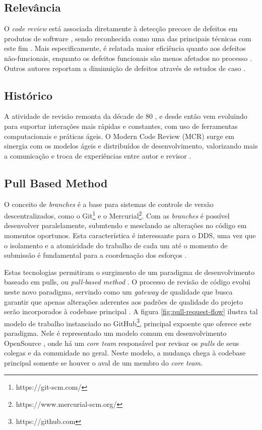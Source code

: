 \documentclass[12pt,openany,oneside,a4paper,english,brazil]{abntbibufjf}
\begin{document}
  \subsection{Relevância}\label{sec:relevancia}
    O \textit{code review} está associada diretamente à detecção precoce de defeitos em produtos de software \cite{schettino2014,Kemerer2009}, sendo reconhecida como uma das principais técnicas com este fim \cite{Boehm2001}. Mais especificamente, é relatada maior eficiência quanto aos defeitos não-funcionais, enquanto os defeitos funcionais são menos afetados no processo \cite{Beller2014202}. Outros autores reportam a diminuição de defeitos através de estudos de caso \cite{McIntosh2014192,Bavota201581,Morales2015171}.

  \subsection{Histórico}\label{sec:historico}
    A atividade de revisão remonta da décade de 80 \cite{Fagan1976}, e desde então vem evoluindo para suportar interações mais rápidas e constantes, com uso de ferramentas computacionais e práticas ágeis. O Modern Code Review (MCR) surge em sinergia com os modelos ágeis e distribuídos de desenvolvimento, valorizando mais a comunicação e troca de experiências entre autor e revisor \cite{Bacchelli2013}.

  \subsection{Pull Based Method}\label{sec:pull_based}
    O conceito de \textit{branches} é a base para sistemas de controle de versão descentralizados, como o  Git\footnote{https://git-scm.com/} e o Mercurial\footnote{https://www.mercurial-scm.org/}. Com as \textit{branches} é possível desenvolver paralelamente, submtendo e mesclando as alterações no código em momentos oportunos. Esta característica é interessante para o DDS, uma vez que o isolamento e a atomicidade do trabalho de cada um até o momento de submissão é fundamental para a coordenação dos esforços \cite{barr2012}.

    Estas tecnologias permitiram o surgimento de um paradigma de desenvolvimento baseado em pulls, ou \textit{pull-based method} \cite{gousios2014}. O processo de revisão de código evolui neste novo paradigma, servindo como um \textit{gateway} de qualidade que busca garantir que apenas alterações aderentes aos padrões de qualidade do projeto serão incorporados à codebase principal \cite{gousios2015}. A figura \ref{fig:pull-request-flow} ilustra tal modelo de trabalho instanciado no GitHub\footnote{https://github.com}, principal expoente que oferece este paradigma. Nele é representado um modelo comum em desenvolvimento OpenSource \cite{6385140}, onde há um \textit{core team} responsável por revisar os \textit{pulls} de seus colegas e da comunidade no geral. Neste modelo, a mudança chega à codebase principal somente se houver o aval de um membro do \textit{core team}.
\end{document}
